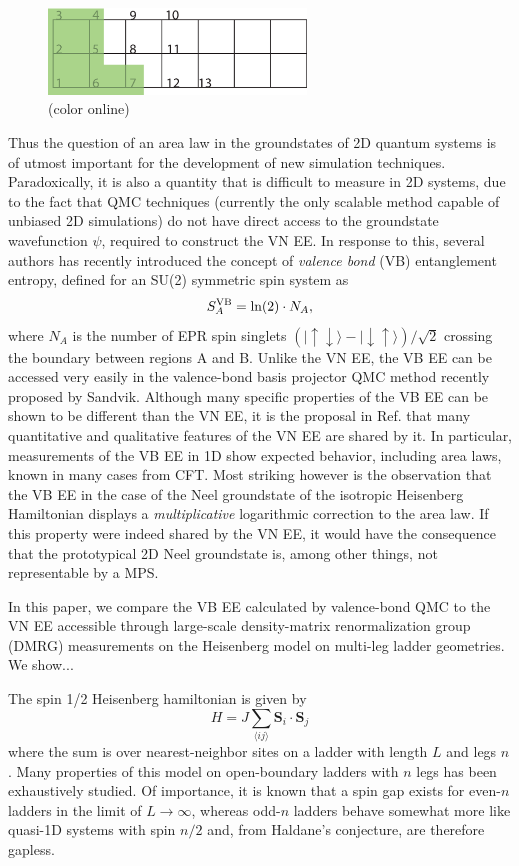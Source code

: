 \documentclass[prl,aps,twocolumn,floatfix,amsmath,amssymb,superscriptaddress,tightenlines]{revtex4}
\begin{document}
\begin{figure}
{
\includegraphics[width=2.7in]{ladder.eps}
\caption{(color online) 
\label{ladder}}}
\end{figure}

Thus the question of an area law in the groundstates of 2D quantum systems is of utmost important for the development of new simulation techniques.  Paradoxically, it is also a quantity that is difficult to measure in 2D systems, due to the fact that QMC techniques (currently the only scalable method capable of unbiased 2D simulations) do not have direct access to the groundstate wavefunction $\psi$, required to construct the VN EE.  In response to this, several authors has recently introduced the concept of {\it valence bond} (VB) entanglement entropy, defined for an SU(2) symmetric spin system as
\begin{equation}
S^{\rm VB}_A = \ln(2) \cdot N_A,
\end{equation}
where $N_A$ is the number of EPR spin singlets ${( |\uparrow \downarrow \rangle - | \downarrow \uparrow \rangle)/\sqrt{2}}$ crossing the boundary between regions A and B.  Unlike the VN EE, the VB EE can be accessed very easily in the valence-bond basis projector QMC method recently proposed by Sandvik.  Although many specific properties of the VB EE can be shown to be different than the VN EE, it is the proposal in Ref. that many quantitative and qualitative features of the VN EE are shared by it.   In particular, measurements of the VB EE in 1D show expected behavior, including area laws,  known in many cases from CFT.  Most striking however is the observation that the VB EE in the case of the Neel groundstate of the isotropic Heisenberg Hamiltonian displays a {\it multiplicative} logarithmic correction to the area law.  If this property were indeed shared by the VN EE, it would have the consequence that the prototypical 2D Neel groundstate is, among other things, not representable by a MPS.

In this paper, we compare the VB EE calculated by valence-bond QMC to the VN EE accessible through large-scale density-matrix renormalization group (DMRG) measurements on the Heisenberg model on multi-leg ladder geometries.    We show...

The spin 1/2 Heisenberg hamiltonian is given by
\begin{equation}
H = J \sum_{\langle i j \rangle} {\mathbf S}_i \cdot {\mathbf S}_j
\end{equation}
where the sum is over nearest-neighbor sites on a ladder with length $L$ and legs $n$.  Many properties of this model on open-boundary ladders with $n$ legs has been exhaustively studied.  Of importance, it is known that a spin gap exists for even-$n$ ladders in the limit of $L\rightarrow \infty$, whereas odd-$n$ ladders behave somewhat more like quasi-1D  systems with spin $n/2$ and, from Haldane's conjecture, are therefore gapless.  
\end{document}
